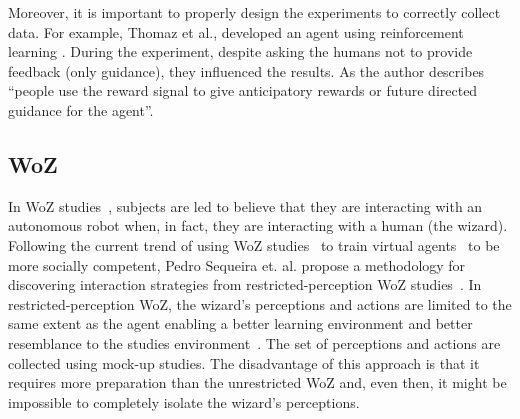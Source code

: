 Moreover, it is important to properly design the experiments to correctly collect data. For example, Thomaz et al., developed an agent using reinforcement learning \cite{Thomaz2006}. During the experiment, despite asking the humans not to provide feedback (only guidance), they influenced the results. As the author describes ``people use the reward signal to give anticipatory rewards or future directed guidance for the agent''.

\subsection{\acf{WoZ}}
\label{subsec:woz}
In \acf{WoZ} studies~\cite{Steinfeld2009}, subjects are led to believe that they are interacting with an autonomous robot when, in fact, they are interacting with a human (the wizard). Following the current trend of using \ac{WoZ} studies~\cite{Steinfeld2009} to train virtual agents~\cite{Knox2014, Mutlu2006} to be more socially competent, Pedro Sequeira et. al. propose a methodology for discovering interaction strategies from restricted-perception \ac{WoZ} studies~\cite{Sequeira2016}. In restricted-perception \ac{WoZ}, the wizard's perceptions and actions are limited to the same extent as the agent enabling a better learning environment and better resemblance to the studies environment~\cite{Sequeira2016}. The set of perceptions and actions are collected using mock-up studies. The disadvantage of this approach is that it requires more preparation than the unrestricted \ac{WoZ} and, even then, it might be impossible to completely isolate the wizard's perceptions.